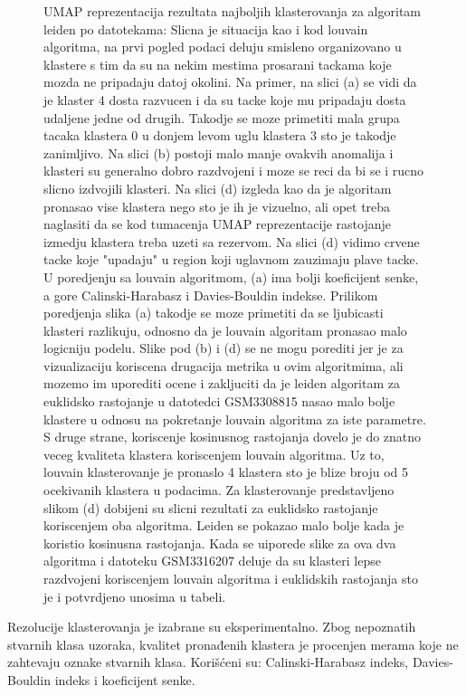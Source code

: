 \documentclass{article}
\begin{document}
\begin{figure}[!h]
    \caption{ UMAP reprezentacija rezultata najboljih klasterovanja za algoritam leiden po datotekama: Slicna je situacija kao i kod louvain algoritma, na prvi pogled podaci deluju smisleno organizovano u klastere s tim da su na nekim mestima prosarani tackama koje mozda ne pripadaju datoj okolini. Na primer, na slici (a) se vidi da je klaster 4 dosta razvucen i da su tacke koje mu pripadaju dosta udaljene jedne od drugih. Takodje se moze primetiti mala grupa tacaka klastera 0 u donjem levom uglu klastera 3 sto je takodje zanimljivo. Na slici (b) postoji malo manje ovakvih anomalija i klasteri su generalno dobro razdvojeni i moze se reci da bi se i rucno slicno izdvojili klasteri. Na slici (d) izgleda kao da je algoritam pronasao vise klastera nego sto je ih je vizuelno, ali opet treba naglasiti da se kod tumacenja UMAP reprezentacije rastojanje izmedju klastera treba uzeti sa rezervom. Na slici (d) vidimo crvene tacke koje "upadaju" u region koji uglavnom zauzimaju plave tacke. U poredjenju sa louvain algoritmom, (a) ima bolji koeficijent senke, a gore Calinski-Harabasz i Davies-Bouldin indekse. Prilikom poredjenja slika (a) takodje se moze primetiti da se ljubicasti klasteri razlikuju, odnosno da je louvain algoritam pronasao malo logicniju podelu. Slike pod (b) i (d) se ne mogu porediti jer je za vizualizaciju koriscena drugacija metrika u ovim algoritmima, ali mozemo im uporediti ocene i zakljuciti da je leiden algoritam za euklidsko rastojanje u datotedci GSM3308815 nasao malo bolje klastere u odnosu na pokretanje louvain algoritma za iste parametre. S druge strane, koriscenje kosinusnog rastojanja dovelo je do znatno veceg kvaliteta klastera koriscenjem louvain algoritma. Uz to, louvain klasterovanje je pronaslo 4 klastera sto je blize broju od 5 ocekivanih klastera u podacima\cite{PBMC_ANN_classification}. Za klasterovanje predstavljeno slikom (d) dobijeni su slicni rezultati za euklidsko rastojanje koriscenjem oba algoritma. Leiden se pokazao malo bolje kada je koristio kosinusna rastojanja. Kada se uiporede slike za ova dva algoritma i datoteku GSM3316207 deluje da su klasteri lepse razdvojeni koriscenjem louvain algoritma i euklidskih rastojanja sto je i potvrdjeno unosima u tabeli. }
    \label{fig:best_leiden}
\end{figure}

Rezolucije klasterovanja je izabrane su eksperimentalno. Zbog nepoznatih stvarnih klasa uzoraka, kvalitet pronađenih klastera je procenjen merama koje ne zahtevaju oznake stvarnih klasa. Korišćeni su: Calinski-Harabasz\cite{calinskiharabasz} indeks, Davies-Bouldin\cite{davies1979cluster} indeks i koeficijent senke.
\end{document}
